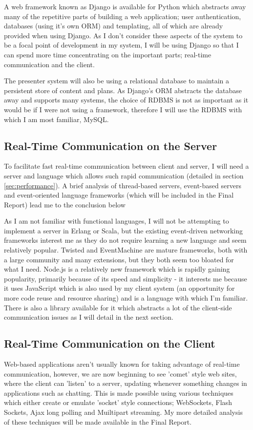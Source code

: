 \documentclass[a4papert,11pt,notitlepage]{ltxdoc}
\begin{document}
A web framework known as Django\cite{django:web} is available for Python which abstracts away many of the repetitive parts of building a web application; user authentication, databases (using it's own ORM) and templating, all of which are already provided when using Django. As I don't consider these aspects of the system to be a focal point of development in my system, I will be using Django so that I can spend more time concentrating on the important parts; real-time communication and the client.

The presenter system will also be using a relational database to maintain a persistent store of content and plans. As Django's ORM abstracts the database away and supports many systems, the choice of RDBMS is not as important as it would be if I were not using a framework, therefore I will use the RDBMS with which I am most familiar, MySQL.

\subsection{Real-Time Communication on the Server}
To facilitate fast real-time communication between client and server, I will need a server and language which allows such rapid communication (detailed in section \ref{sec:performance}). A brief analysis of thread-based servers, event-based servers and event-oriented language frameworks (which will be included in the Final Report) lead me to the conclusion below

As I am not familiar with functional languages, I will not be attempting to implement a server in Erlang or Scala, but the existing event-driven networking frameworks interest me as they do not require learning a new language and seem relatively popular. Twisted and EventMachine are mature frameworks, both with a large community and many extensions, but they both seem too bloated for what I need. Node.js is a relatively new framework which is rapidly gaining popularity, primarily because of its speed and simplicity - it interests me because it uses JavaScript which is also used by my client system (an opportunity for more code reuse and resource sharing) and is a language with which I'm familiar. There is also a library available for it which abstracts a lot of the client-side communication issues as I will detail in the next section.

\subsection{Real-Time Communication on the Client}
Web-based applications aren't usually known for taking advantage of real-time communication, however, we are now beginning to see 'comet'\cite{crane:comet} style web sites, where the client can 'listen' to a server, updating whenever something changes in applications such as chatting. This is made possible using various techniques which either create or emulate 'socket' style connections; WebSockets, Flash Sockets, Ajax long polling and Muiltipart streaming. My more detailed analysis of these techniques will be made available in the Final Report.
\end{document}
